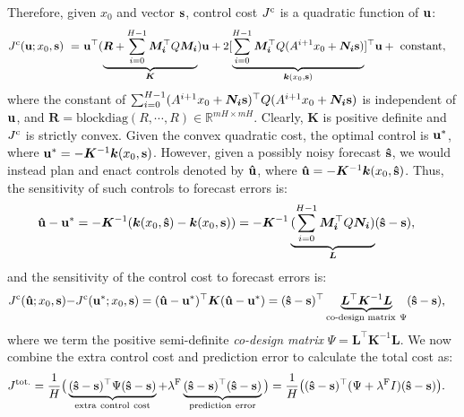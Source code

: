 Therefore, given $x_0$ and vector $\bold{s}$, control cost $J^{\mathrm{c}}$ is a quadratic function of $\bold{u}$:
\begin{align}
J^{\mathrm{c}}(\bold{u}; x_0, \bold{s}) ~=~ &  \bold{u}^\top (\underbrace{\bm{R} + \sum_{i=0}^{H-1} \bm{M_{i}}^\top Q \bm{M_{i}}}_{\bm{K}}) \bold{u} + 2[\underbrace{\sum_{i=0}^{H-1} \bm{M_{i}}^\top Q (A^{i+1} x_0 + \bm{N_{i}} \bold{s})}_{\bm{k}(x_0, \bold{s})}]^\top \bold{u} +~ \text{constant}, \label{eq:quadratic_jmpc}
\end{align}
where the constant of $\sum_{i=0}^{H-1} (A^{i+1} x_0 + \bm{N_{i}} \bold{s})^\top Q (A^{i+1} x_0 + \bm{N_{i}} \bold{s})$ is independent of $\bold{u}$, and $\bm{R} =\text{blockdiag}(R, \cdots, R) \in \mathbb{R}^{mH \times mH}$. Clearly, $\bm{K}$ is positive definite and $J^{\mathrm{c}}$ is strictly convex.
Given the convex quadratic cost, the optimal control is $\bold{u}^{*}$, where $\bold{u}^{*} = - \bm{K}^{-1} \bm{k}(x_0, \bold{s})$. However, given a possibly noisy forecast $\bold{\hat{s}}$, we would instead plan and enact controls denoted by $\bold{\hat{u}}$, where $\bold{\hat{u}} = - \bm{K}^{-1} \bm{k}(x_0, \bold{\hat{s}})$. Thus, the sensitivity of such controls to forecast errors is: 
\begin{align}
& \bold{\hat{u}} - \bold{u}^{*} = - \bm{K}^{-1} (\bm{k}(x_0, \bold{\hat{s}}) - \bm{k}(x_0, \bold{s}))
= - \bm{K}^{-1} \underbrace{(\sum_{i=0}^{H-1} \bm{M_{i}}^\top Q \bm{N_{i}})}_{\bm{L}} (\bold{\hat{s}} - \bold{s}),
\label{eq:control_error}
\end{align}
and the sensitivity of the control cost to forecast errors is:
\begin{align}
    J^{\mathrm{c}}(\bold{\hat{u}}; x_0, \bold{s}) - & J^{\mathrm{c}}(\bold{u}^{*}; x_0, \bold{s})
= (\bold{\hat{u}} - \bold{u}^{*})^\top \bm{K} (\bold{\hat{u}} - \bold{u}^{*}) = (\bold{\hat{s}} - \bold{s})^\top \underbrace{\bm{L}^\top \bm{K}^{-1} \bm{L}}_{\text{co-design matrix} ~\Psi} (\bold{\hat{s}} - \bold{s}), 
\label{eq:codesign_intuitive}
\end{align}
where we term the positive semi-definite \textit{co-design matrix} $\Psi = \bm{L}^\top \bm{K}^{-1} \bm{L}$.
We now combine the extra control cost and prediction error to calculate the total cost as: 
\begin{align}
    J^{\mathrm{tot.}} & = \frac{1}{H}\big(\underbrace{(\bold{\hat{s}} - \bold{s})^\top\Psi(\bold{\hat{s}} - \bold{s})}_{\mathrm{extra~control~cost}} + \lambda^{\mathrm{F}} \underbrace{(\bold{\hat{s}} - \bold{s})^\top (\bold{\hat{s}} - \bold{s})}_{\mathrm{prediction~error}}\big)
    = \frac{1}{H}\big((\bold{\hat{s}} - \bold{s})^\top (\Psi + \lambda^{\mathrm{F}} I) (\bold{\hat{s}} - \bold{s})\big).
\end{align}
